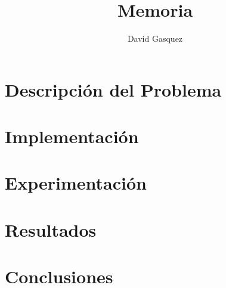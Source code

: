 \documentclass[a4paper,12pt]{article}
\title{
\huge \bfseries Memoria
}
\author{David Gasquez}
\date{}
\begin{document}



\pagestyle{empty}
\renewcommand{\contentsname}{\centering Índice}
\tableofcontents
\newpage



\pagestyle{fancy}
\cfoot{\thepage}
\rhead{}
\renewcommand{\headrulewidth}{0pt}
\renewcommand{\footrulewidth}{0.4pt}
\renewcommand{\headheight}{15pt}



\section{Descripción del Problema}

\newpage
\section{Implementación}

\newpage
\section{Experimentación}

\newpage
\section{Resultados}

\newpage
\section{Conclusiones}


\newpage
\begin{thebibliography}{99}

\end{thebibliography}
\end{document}
